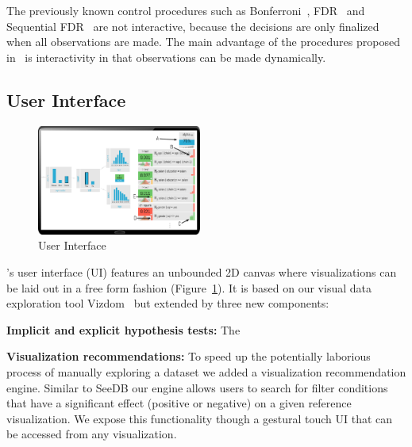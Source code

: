 The previously known control procedures such as Bonferroni~\cite{bonferroni1936teoria}, FDR~\cite{BenjaminiH95} and Sequential FDR~\cite{g2016sequential} are not interactive, because the decisions are only finalized when all observations are made.  The main advantage of the \ainv procedures proposed in~\cite{zhao2016controlling} is interactivity in that observations can be made dynamically.

\subsection{User Interface}
\label{sec:ui}

\begin{figure}
\centering
\includegraphics[width=0.48\textwidth]{figures/ui.pdf}
\caption{User Interface}
\label{fig:ui}	
\end{figure}

\system{}'s user interface (UI) features an unbounded 2D canvas where visualizations can be laid out in a free form fashion (Figure~\ref{fig:ui}). It is based on our visual data exploration tool Vizdom~\cite{vizdom} but extended by three new components:

\textbf{Implicit and explicit hypothesis tests:} The 

\textbf{Visualization recommendations:} To speed up the potentially laborious process of manually exploring a dataset we added a visualization recommendation engine. Similar to SeeDB \cite{seedb} our engine allows users to search for filter conditions that have a significant effect (positive or negative) on a given reference visualization. We expose this functionality though a gestural touch UI that can be accessed from any visualization. 

